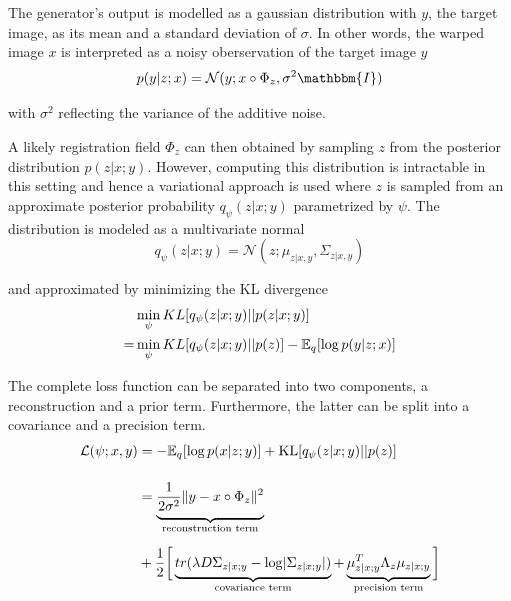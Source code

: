The generator's output is modelled as a gaussian distribution with $y$, the target image, as its mean and a standard deviation of $\sigma$. In other words, the warped image $x$ is interpreted as a noisy oberservation of the target image $y$
\begin{equation}
	p(y|z;x) = \mathcal{N}(y; x \circ \Phi_z, \sigma^2 \mathbbm{I})
\end{equation}

with $\sigma^2$ reflecting the variance of the additive noise.

A likely registration field $\Phi_z$ can then obtained by sampling $z$ from the posterior distribution $p(z | x; y)$.
However, computing this distribution is intractable in this setting and hence a variational approach is used where $z$ is sampled from an approximate posterior probability $q_\psi(z | x; y)$ parametrized by $\psi$. The distribution is modeled as a multivariate normal
\begin{equation}
	q_\psi(z | x; y) = \mathcal{N}(z; \mu_{z | x, y}, \Sigma_{z | x, y})
\end{equation}

and approximated by minimizing the KL divergence
\begin{equation}
	\begin{split}
		  &\min_\psi KL [ q_\psi(z | x; y) || p(z | x; y) ] \\
		= &\min_\psi KL [ q_\psi(z | x; y) || p(z) ] - \mathbb{E}_q [ \log p(y | z; x) ]
	\end{split}
\end{equation}

The complete loss function can be separated into two components, a reconstruction and a prior term. Furthermore, the latter can be split into a covariance and a precision term.
\begin{equation} \label{eq:voxloss}
	\begin{split}
		\mathcal{L}(\psi; x, y)
		& = -\E_{q}[ \log p( x | z; y ) ]
		+ \text{KL} [ q_{\psi} ( z | x ; y ) || p ( z ) ] \\[12pt]
		& = \underbrace{
			\frac{1}{2 \sigma^2} \norm{y - x \circ \Phi_{z}}^{2} \vphantom{\frac{1}{2_{2_2}}}
		}_{\text{reconstruction term}} \\[6pt]
		& + \frac{1}{2} \bigg[
		\underbrace{
			tr( \lambda D \Sigma_{z | x; y} - \log \abs{ \Sigma_{z | x; y} } ) \vphantom{\mu_{z | x; y}^{T}}
		}_{\text{covariance term}} +
		\underbrace{
			\mu_{z | x; y}^{T} \Lambda_{z} \mu_{z | x; y}
		}_{\text{precision term}} \bigg]
	\end{split}
\end{equation}

